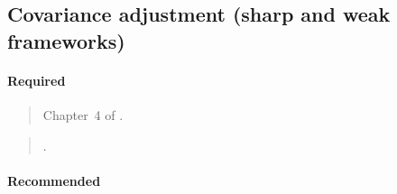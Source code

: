 \documentclass[12pt]{article}
\begin{document}
\begin{verse}  \end{verse}

\begin{verse}  \end{verse}

\begin{verse}  \end{verse}

\begin{verse}  \end{verse}

\begin{verse}  \end{verse}

\subsection{Covariance adjustment (sharp and weak frameworks)}

\paragraph*{Required}

\begin{verse} Chapter~4 of . \end{verse}

\begin{verse} . \end{verse}

\begin{verse}  \end{verse}

\paragraph*{Recommended}

\begin{verse}  \end{verse}

\begin{verse}  \end{verse}

\begin{verse}  \end{verse}
\end{document}
